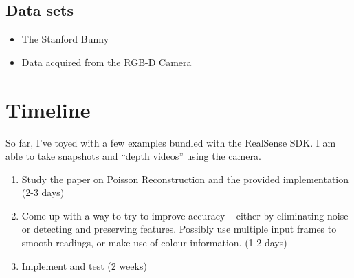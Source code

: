 \documentclass[letterpaper, 10pt]{article}
\begin{document}
\subsection{Data sets}
\begin{itemize}
  \item The Stanford Bunny
  \item Data acquired from the RGB-D Camera
\end{itemize}

\section{Timeline}

So far, I've toyed with a few examples bundled with the RealSense SDK.
I am able to take snapshots and ``depth videos'' using the camera.

\begin{enumerate}
  \item Study the paper on Poisson Reconstruction and the provided implementation (2-3 days)
  \item Come up with a way to try to improve accuracy -- either by eliminating noise or detecting and preserving features. Possibly use multiple input frames to smooth readings, or make use of colour information. (1-2 days)
  \item Implement and test (2 weeks)
\end{enumerate}
\appendix
\newpage


\end{document}
